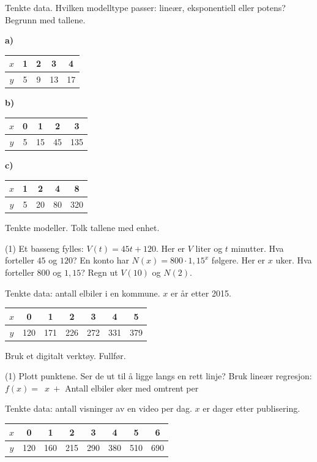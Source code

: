 
Tenkte data. Hvilken modelltype passer: lineær, eksponentiell eller potens? Begrunn med tallene.
\begin{center}
\textbf{a)}\ \begin{tabular}[t]{c|cccc} $x$ & 1 & 2 & 3 & 4\\ \hline $y$ & 5 & 9 & 13 & 17\end{tabular}\qquad
\textbf{b)}\ \begin{tabular}[t]{c|cccc} $x$ & 0 & 1 & 2 & 3\\ \hline $y$ & 5 & 15 & 45 & 135\end{tabular}\qquad
\textbf{c)}\ \begin{tabular}[t]{c|cccc} $x$ & 1 & 2 & 4 & 8\\ \hline $y$ & 5 & 20 & 80 & 320\end{tabular}
\end{center}

Tenkte modeller. Tolk tallene med enhet.
\begin{tasks}(1)
  \task Et basseng fylles: $V(t) = 45t + 120$. Her er $V$ liter og $t$ minutter. Hva forteller $45$ og $120$?
  \task En konto har $N(x) = 800 \cdot 1{,}15^x$ følgere. Her er $x$ uker. Hva forteller $800$ og $1{,}15$?
  \task Regn ut $V(10)$ og $N(2)$.
\end{tasks}

Tenkte data: antall elbiler i en kommune. $x$ er år etter 2015.

\smallskip
\begin{tabular}{@{}c|cccccc@{}}
$x$ & 0 & 1 & 2 & 3 & 4 & 5\\ \hline
$y$ & 120 & 171 & 226 & 272 & 331 & 379\\
\end{tabular}

\smallskip
Bruk et digitalt verktøy. Fullfør.
\begin{tasks}(1)
  \task Plott punktene. Ser de ut til å ligge langs en rett linje?
  \task Bruk lineær regresjon: $f(x) = $ \skrivlinje[2cm]$\,x\ +$ \skrivlinje[2cm]
  \task Antall elbiler øker med omtrent \skrivlinje[2cm] per \skrivlinje[2cm]
\end{tasks}


Tenkte data: antall visninger av en video per dag. $x$ er dager etter publisering.

\smallskip
\begin{tabular}{@{}c|ccccccc@{}}
$x$ & 0 & 1 & 2 & 3 & 4 & 5 & 6\\ \hline
$y$ & 120 & 160 & 215 & 290 & 380 & 510 & 690\\
\end{tabular}

